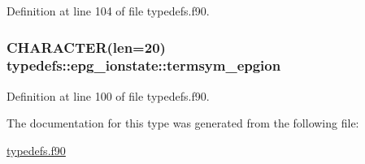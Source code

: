 Definition at line 104 of file typedefs.f90.\hypertarget{typetypedefs_1_1epg__ionstate_ab4319012611e6467da11e7c374dda89c}{
\subsubsection[{termsym\_\-epgion}]{\setlength{\rightskip}{0pt plus 5cm}CHARACTER(len=20) {\bf typedefs::epg\_\-ionstate::termsym\_\-epgion}}}
\label{typetypedefs_1_1epg__ionstate_ab4319012611e6467da11e7c374dda89c}


Definition at line 100 of file typedefs.f90.

The documentation for this type was generated from the following file:\begin{DoxyCompactItemize}
\item 
\hyperlink{typedefs_8f90}{typedefs.f90}\end{DoxyCompactItemize}
